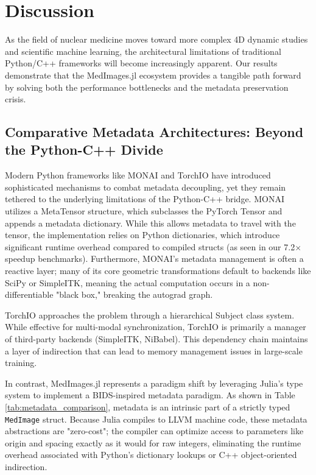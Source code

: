 \documentclass[10pt,letterpaper]{article}
\begin{document}
\section{Discussion}
As the field of nuclear medicine moves toward more complex 4D dynamic studies and scientific machine learning, the architectural limitations of traditional Python/C++ frameworks will become increasingly apparent. Our results demonstrate that the MedImages.jl ecosystem provides a tangible path forward by solving both the performance bottlenecks and the metadata preservation crisis.

\subsection*{Comparative Metadata Architectures: Beyond the Python-C++ Divide}
Modern Python frameworks like MONAI \cite{CardosoLi2022} and TorchIO \cite{perezgarcia2021torchio} have introduced sophisticated mechanisms to combat metadata decoupling, yet they remain tethered to the underlying limitations of the Python-C++ bridge. MONAI utilizes a MetaTensor structure, which subclasses the PyTorch Tensor and appends a metadata dictionary. While this allows metadata to travel with the tensor, the implementation relies on Python dictionaries, which introduce significant runtime overhead compared to compiled structs (as seen in our 7.2$\times$ speedup benchmarks). Furthermore, MONAI's metadata management is often a reactive layer; many of its core geometric transformations default to backends like SciPy or SimpleITK, meaning the actual computation occurs in a non-differentiable "black box," breaking the autograd graph.

TorchIO approaches the problem through a hierarchical Subject class system. While effective for multi-modal synchronization, TorchIO is primarily a manager of third-party backends (SimpleITK, NiBabel). This dependency chain maintains a layer of indirection that can lead to memory management issues in large-scale training. 

In contrast, MedImages.jl represents a paradigm shift by leveraging Julia's type system to implement a BIDS-inspired metadata paradigm. As shown in Table \ref{tab:metadata_comparison}, metadata is an intrinsic part of a strictly typed \texttt{MedImage} struct. Because Julia compiles to LLVM machine code, these metadata abstractions are "zero-cost"; the compiler can optimize access to parameters like origin and spacing exactly as it would for raw integers, eliminating the runtime overhead associated with Python's dictionary lookups or C++ object-oriented indirection.
\end{document}

